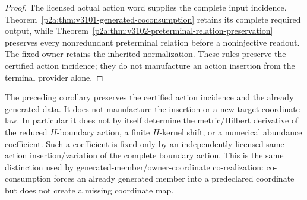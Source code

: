 \documentclass[12pt,a4paper]{article}
\begin{document}
\begin{proof}
The licensed actual action word supplies the complete input incidence.
Theorem~\ref{p2a:thm:v3101-generated-coconsumption} retains its complete
required output, while Theorem~\ref{p2a:thm:v3102-preterminal-relation-preservation}
preserves every nonredundant preterminal relation before a noninjective
readout. The fixed owner retains the inherited normalization. These
rules preserve the certified action incidence; they do not manufacture
an action insertion from the terminal provider alone.
\end{proof}


\begin{remark}
\label{p2a:rem:v3111-k48-response-jet-firewall}
The preceding corollary preserves the certified action incidence and the already
generated data. It does not manufacture the insertion or a new target-coordinate law.  In
particular it does not by itself determine the metric/Hilbert derivative of the
reduced $H$-boundary action, a finite $H$-kernel shift, or a numerical abundance
coefficient.  Such a coefficient is fixed only by an independently licensed
same-action insertion/variation of the complete boundary action.  This is the
same distinction used by generated-member/owner-coordinate co-realization:
co-consumption forces an already generated member into a predeclared coordinate
but does not create a missing coordinate map.
\end{remark}
\end{document}
